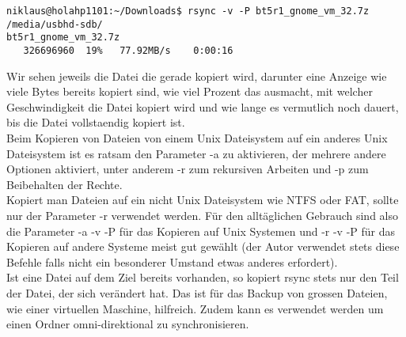\begin{lstlisting}[frame=single]
niklaus@holahp1101:~/Downloads$ rsync -v -P bt5r1_gnome_vm_32.7z /media/usbhd-sdb/
bt5r1_gnome_vm_32.7z
   326696960  19%   77.92MB/s    0:00:16
\end{lstlisting}
Wir sehen jeweils die Datei die gerade kopiert wird, darunter eine Anzeige wie viele Bytes bereits kopiert sind, wie viel Prozent das ausmacht, mit welcher Geschwindigkeit die Datei kopiert wird und wie lange es vermutlich noch dauert, bis die Datei vollstaendig kopiert ist.\\
Beim Kopieren von Dateien von einem Unix Dateisystem auf ein anderes Unix Dateisystem ist es ratsam den Parameter -a zu aktivieren, der mehrere andere Optionen aktiviert, unter anderem -r zum rekursiven Arbeiten und -p zum Beibehalten der Rechte.\\
Kopiert man Dateien auf ein nicht Unix Dateisystem wie NTFS oder FAT, sollte nur der Parameter -r verwendet werden. F\"ur den allt\"aglichen Gebrauch sind also die Parameter -a -v -P f\"ur das Kopieren auf Unix Systemen und -r -v -P f\"ur das Kopieren auf andere Systeme meist gut gew\"ahlt (der Autor verwendet stets diese Befehle falls nicht ein besonderer Umstand etwas anderes erfordert).\\
Ist eine Datei auf dem Ziel bereits vorhanden, so kopiert rsync stets nur den Teil der Datei, der sich ver\"andert hat. Das ist f\"ur das Backup von grossen Dateien, wie einer virtuellen Maschine, hilfreich. Zudem kann es verwendet werden um einen Ordner omni-direktional zu synchronisieren.
